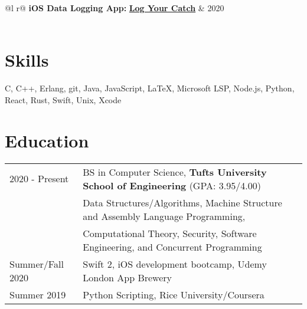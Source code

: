 \documentclass[letter,10pt]{article}
\begin{document}
\begin{tabularx}{\linewidth}{ @{}l r@{} }
    \textbf{iOS Data Logging App:} \href{}{\textbf{Log Your Catch}} & \hfill 2020 \\[3.75pt]
     \\[3.75pt]
\end{tabularx}

\section{Skills}
\normalsize{C, C++, Erlang, git, Java, JavaScript, LaTeX, Microsoft LSP, Node.js, Python, React, Rust, Swift, Unix, Xcode}

\section{Education}
\begin{tabularx}{\linewidth}{@{}l X@{}}	
2020 - Present & BS in Computer Science, \textbf{Tufts University School of Engineering} \hfill \normalsize (GPA: 3.95/4.00) \\
    & \footnotesize{Data Structures/Algorithms, Machine Structure and Assembly Language Programming,} \\
    & \footnotesize{Computational Theory, Security, Software Engineering, and Concurrent Programming} \\[3.75pt]
Summer/Fall 2020 & Swift 2, iOS development bootcamp, Udemy London App Brewery \\[3.75pt]
Summer 2019 & Python Scripting, Rice University/Coursera	
\end{tabularx}



\end{document}
